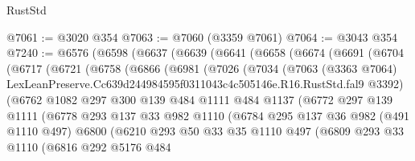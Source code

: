 \begin{lexlean}{RustStd}
\begin{coremodule}
@7061 := @3020 @354
@7063 := @7060 (@3359 @7061)
@7064 := @3043 @354
@7240 := @6576
    (@6598
      (@6637
        (@6639
          (@6641
            (@6658
              (@6674
                (@6691
                  (@6704
                    (@6717
                      (@6721
                        (@6758
                          (@6866
                            (@6981
                              (@7026
                                (@7034
                                  (@7063
                                    (@3363 @7064)
                                    LexLeanPreserve.Cc639d244984595f0311043c4c505146e.R16.RustStd.fal9
                                    @3392)
                                  (@6762
                                    @1082
                                    @297
                                    @300
                                    @139
                                    @484
                                    @1111
                                    @484
                                    @1137
                                    (@6772
                                      @297
                                      @139
                                      @1111
                                      (@6778
                                        @293
                                        @137
                                        @33
                                        @982
                                        @1110
                                        (@6784
                                          @295
                                          @137
                                          @36
                                          @982
                                          (@491 @1110 @497)
                                          @6800
                                          (@6210
                                            @293
                                            @50
                                            @33
                                            @35
                                            @1110
                                            @497
                                            (@6809
                                              @293
                                              @33
                                              @1110
                                              (@6816
                                                @292
                                                @5176
                                                @484

\end{coremodule}
\end{lexlean}

